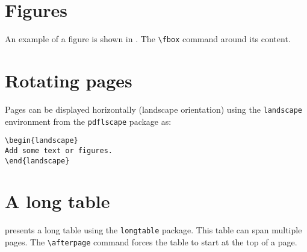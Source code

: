 \section{Figures}
\label{c2:s:figures}

An example of a figure is shown in . The \verb+\fbox+ command  around its content.




\section{Rotating pages}
\label{c2:s:rotating-pages}

Pages can be displayed horizontally (landscape orientation) using the \verb+landscape+ environment  from the \verb+pdflscape+ package as:

\begin{verbatim}
\begin{landscape}
Add some text or figures.
\end{landscape}
\end{verbatim}


\section{A long table}
\label{c2:s:a-long-table}

 presents a long table using the \verb+longtable+ package.
This table can span multiple pages.
The \verb+\afterpage+ command forces the table to start at the top of a page.

\afterpage{}\cleardoublepage
